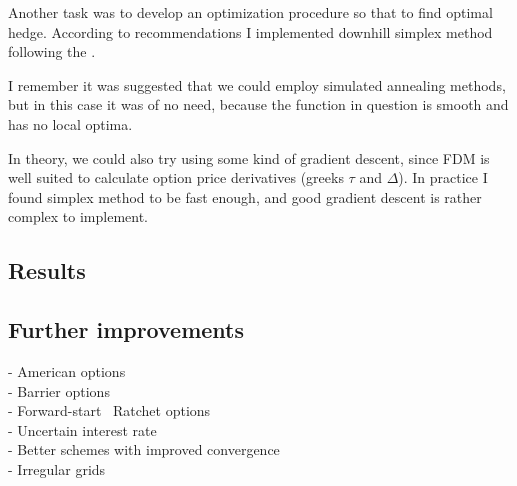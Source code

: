 \documentclass[11pt]{article} %
\begin{document}
Another task was to develop an optimization procedure so that to find optimal hedge. According to recommendations I implemented downhill simplex method following the \cite[\S 10.5]{JacksonStaunton02}. 

I remember it was suggested that we could employ simulated annealing methods, but in this case it was of no need, because the function in question is smooth and has no local optima.

In theory, we could also try using some kind of gradient descent, since FDM is well suited to calculate option price derivatives (greeks $\tau$ and $\Delta$). In practice I found simplex method to be fast enough, and good gradient descent is rather complex to implement.

\subsection{Results}




\subsection{Further improvements}
 - American options\\
 - Barrier options\\
 - Forward-start \ Ratchet options\\
 - Uncertain interest rate\\
 - Better schemes with improved convergence\\
 - Irregular grids
 
\appendix
\end{document}
